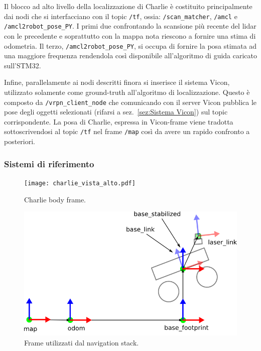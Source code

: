 \vspace{0.5mm}
Il blocco ad alto livello della localizzazione di Charlie \`e costituito principalmente dai nodi che si interfacciano con il topic \verb|/tf|, ossia: \verb|/scan_matcher|, \verb|/amcl| e \verb|/amcl2robot_pose_PY|.
I primi due confrontando la scansione pi\`u recente del lidar con le precedente e soprattutto con la mappa nota riescono a fornire una stima di odometria. Il terzo, \verb|/amcl2robot_pose_PY|, si occupa di fornire la posa stimata ad una maggiore frequenza rendendola cos\`i disponibile all'algoritmo di guida caricato sull'STM32.

\vspace{0.5mm}
Infine, parallelamente ai nodi descritti finora si inserisce il sistema Vicon, utilizzato solamente come ground-truth all'algoritmo di localizzazione. 
Questo \`e composto da \verb|/vrpn_client_node| che comunicando con il server Vicon pubblica le pose degli oggetti selezionati (rifarsi a sez.~\ref{sez:Sistema Vicon}) sul topic corrispondente. 
La posa di Charlie, espressa in Vicon-frame viene tradotta sottoscrivendosi al topic \verb|/tf| nel frame \verb|/map| cos\`i da avere un rapido confronto a posteriori.


\subsubsection{Sistemi di riferimento}
\begin{figure}[h]
	\centering
	\texttt{[image: charlie\_vista\_alto.pdf]}
	\caption{Charlie body frame.}
	\label{fig: charlie body frame}
\end{figure}

\begin{figure}[h]
	\centering
	\includegraphics[height=0.25\textheight]{coordsystems_hector.png}
	\caption{Frame utilizzati dal navigation stack.}
	\label{fig: hector frames}
\end{figure}

